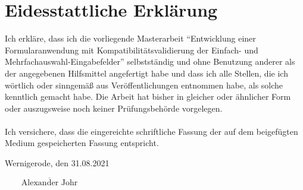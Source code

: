 \chapter*{Eidesstattliche Erklärung}


\vspace{10mm}

Ich erkläre, dass ich die vorliegende Masterarbeit \enquote{Entwicklung einer Formularanwendung mit Kompatibilitätsvalidierung der Einfach- und Mehrfachauswahl-Eingabefelder} selbstständig
und ohne Benutzung anderer als der angegebenen Hilfsmittel angefertigt habe und dass ich alle Stellen,
die ich wörtlich oder sinngemäß aus Veröffentlichungen entnommen habe,
als solche kenntlich gemacht habe.
Die Arbeit hat bisher in gleicher oder ähnlicher Form oder auszugsweise noch keiner Prüfungsbehörde vorgelegen.\\\\

Ich versichere, dass die eingereichte schriftliche Fassung der auf dem beigefügten Medium gespeicherten Fassung entspricht.

\vspace{10mm}

Wernigerode, den 31.08.2021

\begin{flushright}
    $\overline{~~~~~~~~~\mbox{Alexander Johr}~~~~~~~~~}$
\end{flushright}

